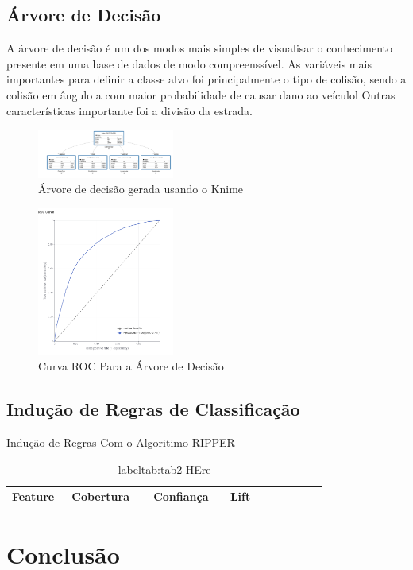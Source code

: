 \documentclass[conference]{IEEEtran}
\begin{document}
\subsection{Árvore de Decisão}

A árvore de decisão é um dos modos mais simples de visualisar o conhecimento presente em uma 
base de dados de modo compreenssível. As variáveis mais importantes para definir a classe alvo foi principalmente o tipo de colisão,
sendo a colisão em ângulo a com maior probabilidade de causar dano ao veículol Outras características importante foi a divisão da estrada.
\begin{figure}[H]
\centerline{\includegraphics[width=0.4\textwidth]{Images/decision-tree.png}}
\caption{\label{fig:decision-tree} Árvore de decisão gerada usando o Knime}
\end{figure}

\begin{figure}[H]
    \centerline{\includegraphics[width=0.4\textwidth]{Images/roc-curve-decision-tree.png}}
    \caption{\label{fig:decision-tree} Curva ROC Para a Árvore de Decisão}
\end{figure}


\subsection{Indução de Regras de Classificação}

\begin{table}[!ht]
    \centering
    \caption{Indução de Regras Com o Algoritimo RIPPER}
    \begin{tabular}{|l|l|l|l|l|l|l|l|l|l|}
    \hline
        Feature~ & Cobertura~ & ~Confiança & ~ Lift \\ \hline
    \end{tabular}
    \caption{label{tab:tab2} HEre}
\end{table}
\section{Conclusão}




\nocite{*}

\end{document}
